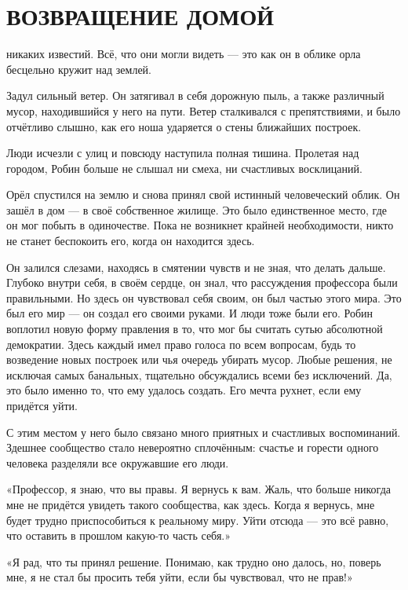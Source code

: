 \documentclass[a4paper,12pt]{book}
\begin{document}
\chapter{ВОЗВРАЩЕНИЕ ДОМОЙ}
\noindent{} никаких известий. Всё, что они могли видеть — это как он в облике орла бесцельно кружит над землей.
\par
Задул сильный ветер. Он затягивал в себя дорожную пыль, а также различный мусор, находившийся у него на пути. Ветер сталкивался с препятствиями, и было отчётливо слышно, как его ноша ударяется о стены ближайших построек.
\par
Люди исчезли с улиц и повсюду наступила полная тишина. Пролетая над городом, Робин больше не слышал ни смеха, ни счастливых восклицаний.
\par
Орёл спустился на землю и снова принял свой истинный человеческий облик. Он зашёл в дом — в своё собственное жилище. Это было единственное место, где он мог побыть в одиночестве. Пока не возникнет крайней необходимости, никто не станет беспокоить его, когда он находится здесь.
\par
Он залился слезами, находясь в смятении чувств и не зная, что делать дальше. Глубоко внутри себя, в своём сердце, он знал, что рассуждения профессора были правильными. Но здесь он чувствовал себя своим, он был частью этого мира. Это был его мир — он создал его своими руками. И люди тоже были его. Робин воплотил новую форму правления в то, что мог бы считать сутью абсолютной демократии. Здесь каждый имел право голоса по всем вопросам, будь то возведение новых построек или чья очередь убирать мусор. Любые решения, не исключая самых банальных, тщательно обсуждались всеми без исключений. Да, это было именно то, что ему удалось создать. Его мечта рухнет, если ему придётся уйти.
\par
С этим местом у него было связано много приятных и счастливых воспоминаний. Здешнее сообщество стало невероятно сплочённым: счастье и горести одного человека разделяли все окружавшие его люди.
\par
«Профессор, я знаю, что вы правы. Я вернусь к вам. Жаль, что больше никогда мне не придётся увидеть такого сообщества, как здесь. Когда я вернусь, мне будет трудно приспособиться к реальному миру. Уйти отсюда — это всё равно, что оставить в прошлом какую-то часть себя.»
\par
«Я рад, что ты принял решение. Понимаю, как трудно оно далось, но, поверь мне, я не стал бы просить тебя уйти, если бы чувствовал, что не прав!»
\end{document}
